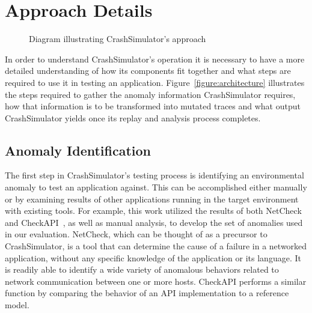 \section{Approach Details}
\label{SEC:approach}

\begin{figure}[t]
  \center{}
  \caption{Diagram illustrating CrashSimulator's approach}
  \label{figure:approach}
\end{figure}

In order to understand CrashSimulator's operation it is necessary to have a
more detailed understanding of how its components fit together and what
steps are required to use it in testing an application.
Figure~\ref{figure:architecture} illustrates the steps required to gather
the anomaly information CrashSimulator requires, how that information is to
be transformed into mutated traces and what output CrashSimulator yields
once its replay and analysis process completes.

\subsection{Anomaly Identification} \label{subsec:anomalyidentification}

The first step in CrashSimulator's testing process is identifying an
environmental anomaly to test an application against.  This can be
accomplished either manually or by examining results of other applications
running in the target environment with existing tools.  For example, this
work utilized the results of both NetCheck~\cite{Zhuang_NSDI_2014} and
CheckAPI~\cite{rasley2015detecting}, as well as manual analysis, to develop
the set of anomalies used in our evaluation.  NetCheck, which can be
thought of as a precursor to CrashSimulator, is a tool that can determine
the cause of a failure in a networked application, without any specific
knowledge of the application or its language. It is readily able to
identify a wide variety of anomalous behaviors related to network
communication between one or more hosts.  CheckAPI performs a similar
function by comparing the behavior of an API implementation to a reference
model.


